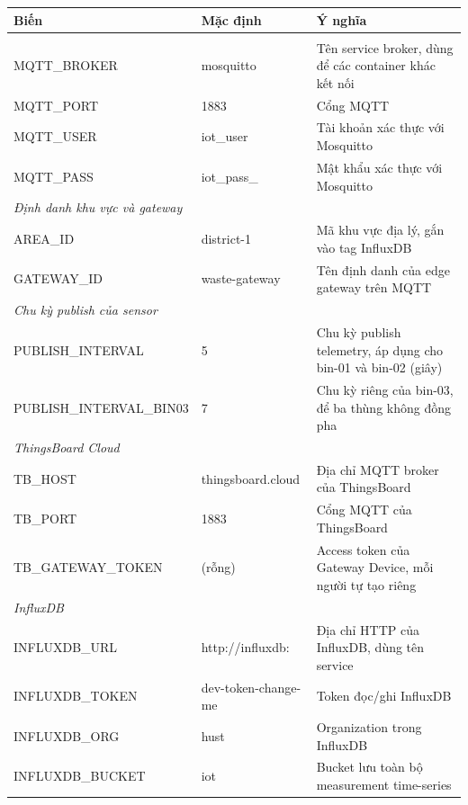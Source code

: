 \documentclass[12pt,a4paper]{article}
\begin{document}
\small
\renewcommand{\arraystretch}{1.2}
\begin{longtable}{p{4.8cm}p{2.2cm}p{7.5cm}}
\toprule
\textbf{Biến} & \textbf{Mặc định} & \textbf{Ý nghĩa} \\
\midrule
\endhead
\bottomrule
\endlastfoot
\multicolumn{3}{l}{\textit{MQTT Broker}} \\
MQTT\_\allowbreak BROKER & mosquitto & Tên service broker, dùng để các container khác kết nối \\
MQTT\_\allowbreak PORT & 1883 & Cổng MQTT \\
MQTT\_\allowbreak USER & iot\_\allowbreak user & Tài khoản xác thực với Mosquitto \\
MQTT\_\allowbreak PASS & iot\_\allowbreak pass\_\allowbreak 2026 & Mật khẩu xác thực với Mosquitto \\
\multicolumn{3}{l}{\textit{Định danh khu vực và gateway}} \\
AREA\_\allowbreak ID & district-1 & Mã khu vực địa lý, gắn vào tag InfluxDB \\
GATEWAY\_\allowbreak ID & waste-gateway & Tên định danh của edge gateway trên MQTT \\
\multicolumn{3}{l}{\textit{Chu kỳ publish của sensor}} \\
PUBLISH\_\allowbreak INTERVAL & 5 & Chu kỳ publish telemetry, áp dụng cho bin-01 và bin-02 (giây) \\
PUBLISH\_\allowbreak INTERVAL\_\allowbreak BIN03 & 7 & Chu kỳ riêng của bin-03, để ba thùng không đồng pha \\
\multicolumn{3}{l}{\textit{ThingsBoard Cloud}} \\
TB\_\allowbreak HOST & thingsboard.\allowbreak cloud & Địa chỉ MQTT broker của ThingsBoard \\
TB\_\allowbreak PORT & 1883 & Cổng MQTT của ThingsBoard \\
TB\_\allowbreak GATEWAY\_\allowbreak TOKEN & (rỗng) & Access token của Gateway Device, mỗi người tự tạo riêng \\
\multicolumn{3}{l}{\textit{InfluxDB}} \\
INFLUXDB\_\allowbreak URL & http://\allowbreak influxdb:\allowbreak 8086 & Địa chỉ HTTP của InfluxDB, dùng tên service \\
INFLUXDB\_\allowbreak TOKEN & dev-token-change-me & Token đọc/ghi InfluxDB \\
INFLUXDB\_\allowbreak ORG & hust & Organization trong InfluxDB \\
INFLUXDB\_\allowbreak BUCKET & iot & Bucket lưu toàn bộ measurement time-series \\

\end{longtable}
\end{document}
